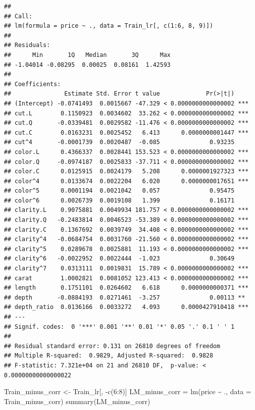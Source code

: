 \documentclass[
]{article}
\newenvironment{Shaded}{\begin{snugshade}}{\end{snugshade}}
\newcommand{\AttributeTok}[1]{\textcolor[rgb]{0.77,0.63,0.00}{#1}}
\newcommand{\DecValTok}[1]{\textcolor[rgb]{0.00,0.00,0.81}{#1}}
\newcommand{\FunctionTok}[1]{\textcolor[rgb]{0.00,0.00,0.00}{#1}}
\newcommand{\NormalTok}[1]{#1}
\newcommand{\OtherTok}[1]{\textcolor[rgb]{0.56,0.35,0.01}{#1}}
\newcommand{\SpecialCharTok}[1]{\textcolor[rgb]{0.00,0.00,0.00}{#1}}
\begin{document}
\begin{verbatim}
##
## Call:
## lm(formula = price ~ ., data = Train_lr[, c(1:6, 8, 9)])
##
## Residuals:
##      Min       1Q   Median       3Q      Max
## -1.04014 -0.08295  0.00025  0.08161  1.42593
##
## Coefficients:
##               Estimate Std. Error t value             Pr(>|t|)
## (Intercept) -0.0741493  0.0015667 -47.329 < 0.0000000000000002 ***
## cut.L        0.1150923  0.0034602  33.262 < 0.0000000000000002 ***
## cut.Q       -0.0339481  0.0029582 -11.476 < 0.0000000000000002 ***
## cut.C        0.0163231  0.0025452   6.413      0.0000000001447 ***
## cut^4       -0.0001739  0.0020487  -0.085              0.93235
## color.L      0.4366337  0.0028441 153.523 < 0.0000000000000002 ***
## color.Q     -0.0974187  0.0025833 -37.711 < 0.0000000000000002 ***
## color.C      0.0125915  0.0024179   5.208      0.0000001927323 ***
## color^4      0.0133674  0.0022204   6.020      0.0000000017651 ***
## color^5      0.0001194  0.0021042   0.057              0.95475
## color^6      0.0026739  0.0019108   1.399              0.16171
## clarity.L    0.9075881  0.0049934 181.757 < 0.0000000000000002 ***
## clarity.Q   -0.2483814  0.0046523 -53.389 < 0.0000000000000002 ***
## clarity.C    0.1367692  0.0039749  34.408 < 0.0000000000000002 ***
## clarity^4   -0.0684754  0.0031760 -21.560 < 0.0000000000000002 ***
## clarity^5    0.0289678  0.0025881  11.193 < 0.0000000000000002 ***
## clarity^6   -0.0022952  0.0022444  -1.023              0.30649
## clarity^7    0.0313111  0.0019831  15.789 < 0.0000000000000002 ***
## carat        1.0002821  0.0081052 123.413 < 0.0000000000000002 ***
## length       0.1751101  0.0264602   6.618      0.0000000000371 ***
## depth       -0.0884193  0.0271461  -3.257              0.00113 **
## depth_ratio  0.0136166  0.0033272   4.093      0.0000427910418 ***
## ---
## Signif. codes:  0 '***' 0.001 '**' 0.01 '*' 0.05 '.' 0.1 ' ' 1
##
## Residual standard error: 0.131 on 26810 degrees of freedom
## Multiple R-squared:  0.9829, Adjusted R-squared:  0.9828
## F-statistic: 7.321e+04 on 21 and 26810 DF,  p-value: < 0.00000000000000022
\end{verbatim}

\begin{Shaded}
\begin{Highlighting}[]
\NormalTok{Train\_minus\_corr }\OtherTok{\textless{}{-}}\NormalTok{ Train\_lr[, }\SpecialCharTok{{-}}\FunctionTok{c}\NormalTok{(}\DecValTok{6}\SpecialCharTok{:}\DecValTok{8}\NormalTok{)]}
\NormalTok{LM\_minus\_corr }\OtherTok{=} \FunctionTok{lm}\NormalTok{(price }\SpecialCharTok{\textasciitilde{}}\NormalTok{ ., }\AttributeTok{data =}\NormalTok{ Train\_minus\_corr)}
\FunctionTok{summary}\NormalTok{(LM\_minus\_corr)}
\end{Highlighting}
\end{Shaded}
\end{document}
